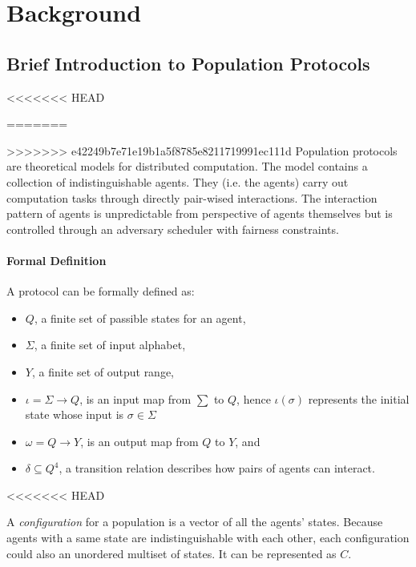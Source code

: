 \section{Background}
\subsection{Brief Introduction to Population Protocols \cite{AspnesR2007, MCS11}}
<<<<<<< HEAD
\par\noindent
=======
\par
>>>>>>> e42249b7e71e19b1a5f8785e8211719991ec111d
Population protocols are theoretical models for distributed computation.
The model contains a collection of indistinguishable agents.
They (i.e. the agents) carry out computation tasks through directly pair-wised interactions.
The interaction pattern of agents is unpredictable from perspective of agents themselves
but is controlled through an adversary scheduler with fairness constraints.
\paragraph{Formal Definition}
A protocol can be formally defined as:
\begin{itemize}
  \item $Q$, a finite set of passible states for an agent,
  \item $\Sigma$, a finite set of input alphabet,
  \item $Y$, a finite set of output range,
  \item $\iota = \Sigma \to Q $, is an input map from $\sum$ to $Q$, hence $\iota(\sigma)$ represents the initial state whose input is $\sigma \in \Sigma$
  \item $\omega = Q \to Y $, is an output map from $Q$ to $Y$, and
  \item $\delta \subseteq Q^{4}$, a transition relation describes how pairs of agents can interact.
\end{itemize}
<<<<<<< HEAD

\par\noindent
A \textit{configuration} for a population is a vector of all the agents' states.
Because agents with a same state are indistinguishable with each other, each configuration
could also an unordered multiset of states. It can be represented as $C$.


